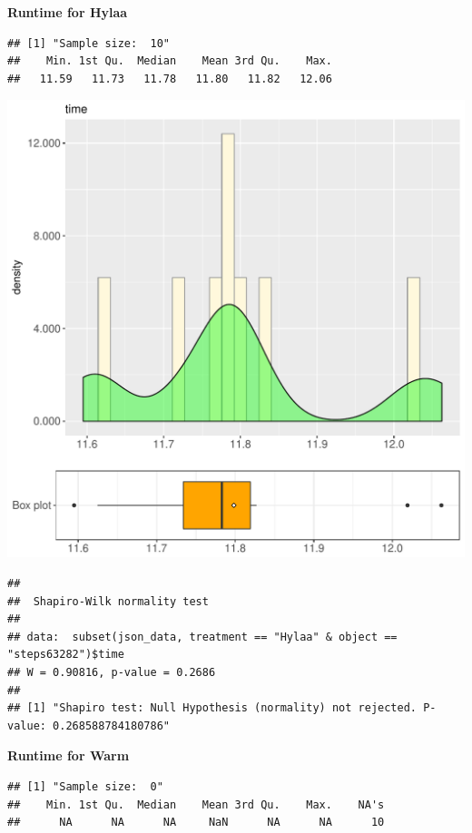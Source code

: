 \documentclass{article}\usepackage[]{graphicx}\usepackage[]{color}
\makeatletter
\def\maxwidth{ %
  \ifdim\Gin@nat@width>\linewidth
    \linewidth
  \else
    \Gin@nat@width
  \fi
}
\newenvironment{kframe}{%
 \def\at@end@of@kframe{}%
 \ifinner\ifhmode%
  \def\at@end@of@kframe{\end{minipage}}%
  \begin{minipage}{\columnwidth}%
 \fi\fi%
 \def\FrameCommand##1{\hskip\@totalleftmargin \hskip-\fboxsep
 \colorbox{shadecolor}{##1}\hskip-\fboxsep
     \hskip-\linewidth \hskip-\@totalleftmargin \hskip\columnwidth}%
 \MakeFramed {\advance\hsize-\width
   \@totalleftmargin\z@ \linewidth\hsize
   \@setminipage}}%
 {\par\unskip\endMakeFramed%
 \at@end@of@kframe}
\newenvironment{knitrout}{}{} %
\makeatother
\begin{document}
 \textbf{Runtime for Hylaa}
\begin{knitrout}
\color{fgcolor}\begin{kframe}
\begin{verbatim}
## [1] "Sample size:  10"
##    Min. 1st Qu.  Median    Mean 3rd Qu.    Max. 
##   11.59   11.73   11.78   11.80   11.82   12.06
\end{verbatim}
\end{kframe}
\includegraphics[width=\maxwidth]{figure/RH1_Hylaa_steps63282-1} 
\begin{kframe}\begin{verbatim}
## 
## 	Shapiro-Wilk normality test
## 
## data:  subset(json_data, treatment == "Hylaa" & object == "steps63282")$time
## W = 0.90816, p-value = 0.2686
## 
## [1] "Shapiro test: Null Hypothesis (normality) not rejected. P-value: 0.268588784180786"
\end{verbatim}
\end{kframe}
\end{knitrout}
 \textbf{Runtime for Warm}
\begin{knitrout}
\color{fgcolor}\begin{kframe}
\begin{verbatim}
## [1] "Sample size:  0"
##    Min. 1st Qu.  Median    Mean 3rd Qu.    Max.    NA's 
##      NA      NA      NA     NaN      NA      NA      10
\end{verbatim}
\end{kframe}
\end{knitrout}
  
\end{document}
